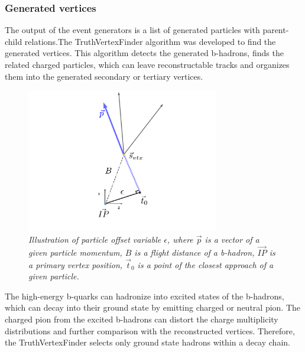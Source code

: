 \subsubsection{Generated vertices}
The output of the event generators is a list of generated particles with parent-child relations.The TruthVertexFinder algorithm was developed to find the generated vertices.%
This algorithm detects the generated b-hadrons, finds the related charged particles, which can leave reconstructable tracks and organizes them into the generated secondary or tertiary vertices.
\begin{figure}[h]
	{\centering
		\includegraphics[width=0.75\textwidth]{ILD/plots/offset-graph.pdf}
		\caption{\sl Illustration of particle offset variable $\epsilon$, where $\vec{p}$ is a vector of a given particle momentum, $B$ is a flight distance of a b-hadron, $\vec{IP}$ is a primary vertex position, $\vec{t}_0$ is a point of the closest approach of a given particle. 
		}
		\label{fig:OffsetPic_3}
	}
\end{figure}





The high-energy b-quarks can hadronize into excited states of the b-hadrons, which can decay into their ground state by emitting charged or neutral pion. 
The charged pion from the excited b-hadrons can distort the charge multiplicity distributions and further comparison with the reconstructed vertices. Therefore, the TruthVertexFinder selects only ground state hadrons within a decay chain. 

